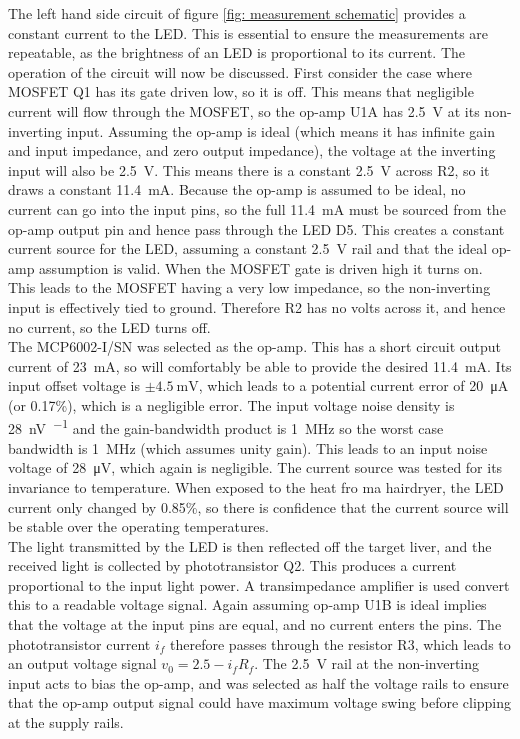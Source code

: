 The left hand side circuit of figure \ref{fig: measurement schematic} provides a constant current to the LED. This is essential to ensure the measurements are repeatable, as the brightness of an LED is proportional to its current. The operation of the circuit will now be discussed. First consider the case where MOSFET Q1 has its gate driven low, so it is off. This means that negligible current will flow through the MOSFET, so the op-amp U1A has \SI{2.5}{\volt} at its non-inverting input. Assuming the op-amp is ideal (which means it has infinite gain and input impedance, and zero output impedance), the voltage at the inverting input will also be \SI{2.5}{\volt}. This means there is a constant \SI{2.5}{\volt} across R2, so it draws a constant \SI{11.4}{\milli\ampere}. Because the op-amp is assumed to be ideal, no current can go into the input pins, so the full \SI{11.4}{\milli\ampere} must be sourced from the op-amp output pin and hence pass through the LED D5. This creates a constant current source for the LED, assuming a constant \SI{2.5}{\volt} rail and that the ideal op-amp assumption is valid. When the MOSFET gate is driven high it turns on. This leads to the MOSFET having a very low impedance, so the non-inverting input is effectively tied to ground. Therefore R2 has no volts across it, and hence no current, so the LED turns off.\\

The MCP6002-I/SN \cite{mcp6002} was selected as the op-amp. This has a short circuit output current of \SI{23}{\milli\ampere}, so will comfortably be able to provide the desired \SI{11.4}{\milli\ampere}. Its input offset voltage is $\pm\SI{4.5}{\milli\volt}$, which leads to a potential current error of \SI{20}{\micro\ampere} (or 0.17\%), which is a negligible error. The input voltage noise density is \SI{28}{\nano\volt\per\sqrt{\hertz}} and the gain-bandwidth product is \SI{1}{\mega\hertz} so the worst case bandwidth is \SI{1}{\mega\hertz} (which assumes unity gain). This leads to an input noise voltage of \SI{28}{\micro\volt}, which again is negligible. The current source was tested for its invariance to temperature. When exposed to the heat fro ma hairdryer, the LED current only changed by 0.85\%, so there is confidence that the current source will be stable over the operating temperatures.\\

The light transmitted by the LED is then reflected off the target liver, and the received light is collected by phototransistor Q2. This produces a current proportional to the input light power. A transimpedance amplifier is used convert this to a readable voltage signal. Again assuming op-amp U1B is ideal implies that the voltage at the input pins are equal, and no current enters the pins. The phototransistor current $i_f$ therefore passes through the resistor R3, which leads to an output voltage signal $v_0 = 2.5 - i_fR_f$. The \SI{2.5}{\volt} rail at the non-inverting input acts to bias the op-amp, and was selected as half the voltage rails to ensure that the op-amp output signal could have maximum voltage swing before clipping at the supply rails.\\

